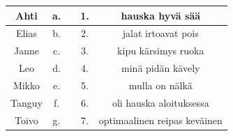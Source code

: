\documentclass[10pt,finnish,a5paper,headings=small,twoside=semi]{scrartcl}
\begin{document}
\begin{center}
	\begin{tabular}{ |c||ccc||c| }
		\hline
		Ahti & a. & & 1. & hauska hyvä sää \\
		\hline
		Elias & b. & & 2. & jalat irtoavat pois \\
		\hline
		Janne & c. & & 3. & kipu kärsimys ruoka \\
		\hline
		Leo & d. & & 4. & minä pidän kävely \\
		\hline
		Mikko & e. & & 5. & mulla on nälkä \\
		\hline
		Tanguy & f. & & 6. & oli hauska aloituksessa \\
		\hline
		Toivo & g. & & 7. & optimaalinen reipas keväinen \\
		\hline



	\end{tabular}
\end{center}
\end{document}
